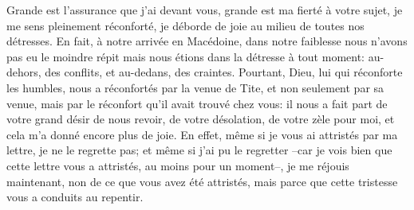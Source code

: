 Grande est l’assurance que j’ai devant vous,
	grande est ma fierté à votre sujet,
	je me sens pleinement réconforté,
	je déborde de joie au milieu de toutes nos détresses.
En fait, à notre arrivée en Macédoine,
	dans notre faiblesse nous n’avons pas eu le moindre répit
	mais nous étions dans la détresse à tout moment:
	au-dehors, des conflits, et au-dedans, des craintes.
Pourtant, Dieu, lui qui réconforte les humbles,
	nous a réconfortés par la venue de Tite,
	et non seulement par sa venue,
		mais par le réconfort qu’il avait trouvé chez vous:
	il nous a fait part de votre grand désir de nous revoir,
	de votre désolation, de votre zèle pour moi,
	et cela m’a donné encore plus de joie.
En effet, même si je vous ai attristés par ma lettre, je ne le regrette pas;
	et même si j’ai pu le regretter
	–car je vois bien que cette lettre vous a attristés,
		au moins pour un moment–,
	je me réjouis maintenant, non de ce que vous avez été attristés,
	mais parce que cette tristesse vous a conduits au repentir.
